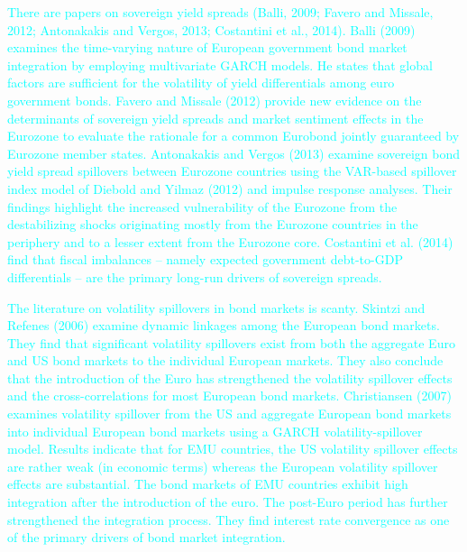\documentclass[12pt,bibliography=totoc]{article}
\begin{document}
\textcolor{cyan}{There are papers on sovereign yield spreads (Balli, 2009; Favero and Missale, 2012; Antonakakis and Vergos, 2013; Costantini et al., 2014). Balli (2009) examines the time-varying nature of European government bond market integration by employing multivariate GARCH models. He states that global factors are sufficient for the volatility of yield differentials among euro government bonds. Favero and Missale (2012) provide new evidence on the determinants of sovereign yield spreads and market sentiment effects in the Eurozone to evaluate the rationale for a common Eurobond jointly guaranteed by Eurozone member states. Antonakakis and Vergos (2013) examine sovereign bond yield spread spillovers between Eurozone countries using the VAR-based spillover index model of Diebold and Yilmaz (2012) and impulse response analyses. Their findings highlight the increased vulnerability of the Eurozone from the destabilizing shocks originating mostly from the Eurozone countries in the periphery and to a lesser extent from the Eurozone core. Costantini et al. (2014) find that fiscal imbalances – namely expected government debt-to-GDP differentials – are the primary long-run drivers of sovereign spreads.}

\textcolor{cyan}{The literature on volatility spillovers in bond markets is scanty. Skintzi and Refenes (2006) examine dynamic linkages among the European bond markets. They find that significant volatility spillovers exist from both the aggregate Euro and US bond markets to the individual European markets. They also conclude that the introduction of the Euro has strengthened the volatility spillover effects and the cross-correlations for most European bond markets. Christiansen (2007) examines volatility spillover from the US and aggregate European bond markets into individual European bond markets using a GARCH volatility-spillover model. Results indicate that for EMU countries, the US volatility spillover effects are rather weak (in economic terms) whereas the European volatility spillover effects are substantial. The bond markets of EMU countries exhibit high integration after the introduction of the euro. The post-Euro period has further strengthened the integration process. They find interest rate convergence as one of the primary drivers of bond market integration.}
\end{document}

